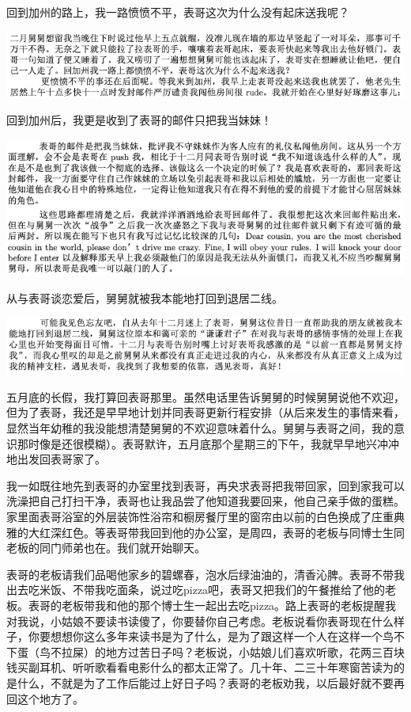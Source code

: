 \documentclass[9pt, b5paper]{article}
\begin{document}
回到加州的路上，我一路愤愤不平，表哥这次为什么没有起床送我呢？

\begin{center}
\includegraphics[width=.9\linewidth]{./pic/p1p54-2.png}
\end{center}

回到加州后，我更是收到了表哥的邮件只把我当妹妹！

\begin{center}
\includegraphics[width=.9\linewidth]{./pic/p1p55.png}
\end{center}

从与表哥谈恋爱后，舅舅就被我本能地打回到退居二线。

\begin{center}
\includegraphics[width=.9\linewidth]{./pic/p1p55-2.png}
\end{center}

五月底的长假，我打算回表哥那里。虽然电话里告诉舅舅的时候舅舅说他不欢迎，但为了表哥，我还是早早地计划并同表哥更新行程安排（从后来发生的事情来看，显然当年幼稚的我没能想清楚舅舅的不欢迎意味着什么。舅舅与表哥之间，我的意识那时像是还很模糊）。表哥默许，五月底那个星期三的下午，我就早早地兴冲冲地出发回表哥家了。

我一如既往地先到表哥的办室里找到表哥，再央求表哥把我带回家，回到家我可以洗澡把自己打扫干净，表哥也让我品尝了他知道我要回来，他自己亲手做的蛋糕。家里面表哥浴室的外层装饰性浴帘和橱房餐厅里的窗帘由以前的白色换成了庄重典雅的大红深红色。等表哥带我回到他的办公室，是周四，表哥的老板与同博士生同老板的同门师弟也在。我们就开始聊天。

表哥的老板请我们品喝他家乡的碧螺春，泡水后绿油油的，清香沁脾。表哥不带我出去吃米饭、不带我吃面条，说过吃pizza吧，表哥又把我们的午餐推给了他的老板。表哥的老板带我和他的那个博士生一起出去吃pizza。路上表哥的老板提醒我对我说，小姑娘不要读书读傻了，你要替你自己考虑。老板说看你表哥现在什么样子，你要想想你这么多年来读书是为了什么，是为了跟这样一个人在这样一个鸟不下蛋（鸟不拉屎）的地方过苦日子吗？老板说，小姑娘儿们喜欢听歌，花两三百块钱买副耳机、听听歌看看电影什么的都太正常了。几十年、二三十年寒窗苦读为的是什么，不就是为了工作后能过上好日子吗？表哥的老板劝我，以后最好就不要再回这个地方了。
\end{document}
